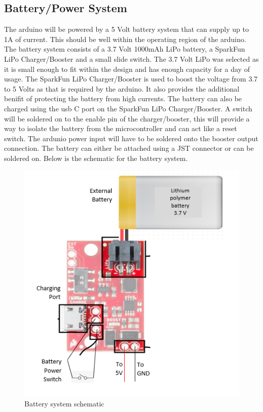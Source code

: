 \documentclass[12pt, titlepage]{article}
\begin{document}
\subsection{Battery/Power System}
The arduino will be powered by a 5 Volt battery system that can supply up to 1A of current. This should be well within the operating region of the arduino. The battery system consists of a 3.7 Volt 1000mAh  LiPo battery, a SparkFun LiPo Charger/Booster and a small slide switch. The 3.7 Volt LiPo was selected as it is small enough to fit within the design and has enough capacity for a day of usage. The SparkFun LiPo Charger/Booster is used to boost the voltage from 3.7 to 5 Volts as that is required by the arduino. It also provides the additional benifit of protecting the battery from high currents. The battery can also be charged using the usb C port on the SparkFun LiPo Charger/Booster. A switch will be soldered on to the enable pin of the charger/booster, this will provide a way to isolate the battery from the microcontroller and can act like a reset switch. The ardunio power input will have to be soldered onto the booster output connection. The battery can either be attached using a JST connector or can be soldered on. Below is the schematic for the battery system.   
 \begin{figure}[H]
\centering
  \includegraphics[width=\textwidth,height=\textheight/2,keepaspectratio]{BatterySchematic.png}
  \caption{Battery system schematic}
  \label{batteryschematic} 
\end{figure}
\end{document}
